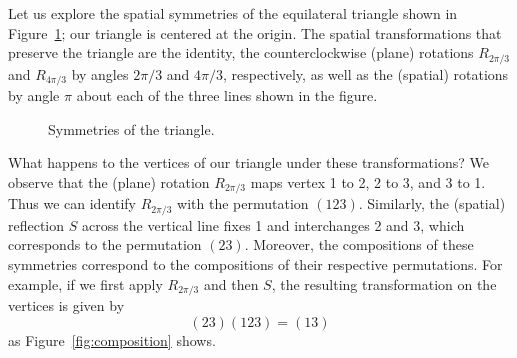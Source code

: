 



\begin{example}
Let us explore the spatial symmetries of the equilateral triangle shown in Figure~\ref{fig:triangle}; our triangle is centered at the origin. The spatial transformations that preserve the triangle are the identity, the counterclockwise (plane) rotations  $R_{2\pi/3}$  and  $R_{4\pi/3}$ by angles $2\pi/3$ and  $4\pi/3$, respectively, as well as the (spatial) rotations by angle  $\pi$  about each of the three lines shown in the figure.
\begin{figure}[h]
\caption{Symmetries of the triangle.}
\label{fig:triangle}
\end{figure}



What happens to the vertices of our triangle under these transformations? We observe that the (plane) rotation  $R_{2\pi/3}$  maps vertex  1  to  2,  2  to  3, and  3  to  1. Thus we can identify $R_{2\pi/3}$ with the permutation  $(123)$. Similarly, the (spatial) reflection  $S$  across the vertical line fixes  1  and interchanges  2  and  3, which corresponds to the permutation $(23)$.
Moreover, the compositions of these symmetries correspond to the compositions of their respective permutations. For example, if we first apply  $R_{2\pi/3}$  and then $S$, the resulting transformation on the vertices is given by
\[
(23)(123)=(13)
\]
as Figure~\ref{fig:composition} shows. 

\begin{figure}
\begin{tikzpicture}


\end{tikzpicture}
\end{figure}
\end{example}

